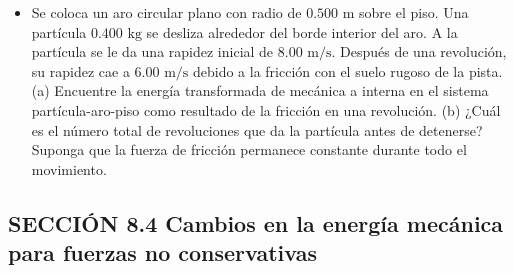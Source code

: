 \documentclass[11pt,a4paper]{article}
\begin{document}
\newpage

\begin{itemize}
    \item[\textbf{9.}] Se coloca un aro circular plano con radio de $0.500 \text{ m}$ sobre el piso. Una partícula $0.400 \text{ kg}$ se desliza alrededor del borde interior del aro. A la partícula se le da una rapidez inicial de $8.00 \text{ m/s}$. Después de una revolución, su rapidez cae a $6.00 \text{ m/s}$ debido a la fricción con el suelo rugoso de la pista. (a) Encuentre la energía transformada de mecánica a interna en el sistema partícula-aro-piso como resultado de la fricción en una revolución. (b) ¿Cuál es el número total de revoluciones que da la partícula antes de detenerse? Suponga que la fuerza de fricción permanece constante durante todo el movimiento.
    \vspace*{6cm}
\end{itemize}

\subsection*{SECCIÓN 8.4 Cambios en la energía mecánica para fuerzas no conservativas}
\end{document}
